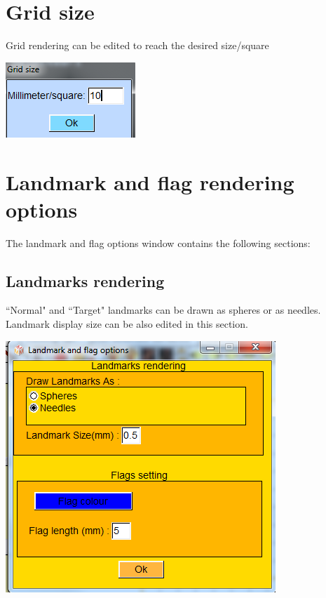 \section{Grid size}


\noindent
\begin{minipage}{0.55\textwidth}
Grid rendering can be edited to reach the desired size/square
\end{minipage}  
 \begin{minipage}{0.45\textwidth}\centering
\includegraphics[scale=0.5]{images/Viewing_options/Grid_size.png}

 \end{minipage} 
\noindent





\noindent
\begin{minipage}{0.55\textwidth}


\section{Landmark and flag rendering options}
The landmark and flag options window contains the following sections:

\subsection{Landmarks rendering}
``Normal" and ``Target" landmarks can be drawn as spheres or as needles. Landmark display size can be also edited in this section.
\end{minipage}  
 \begin{minipage}{0.45\textwidth}\centering
\includegraphics[scale=0.5]{images/Viewing_options/Landmark_options.png}

 \end{minipage} 
\noindent
